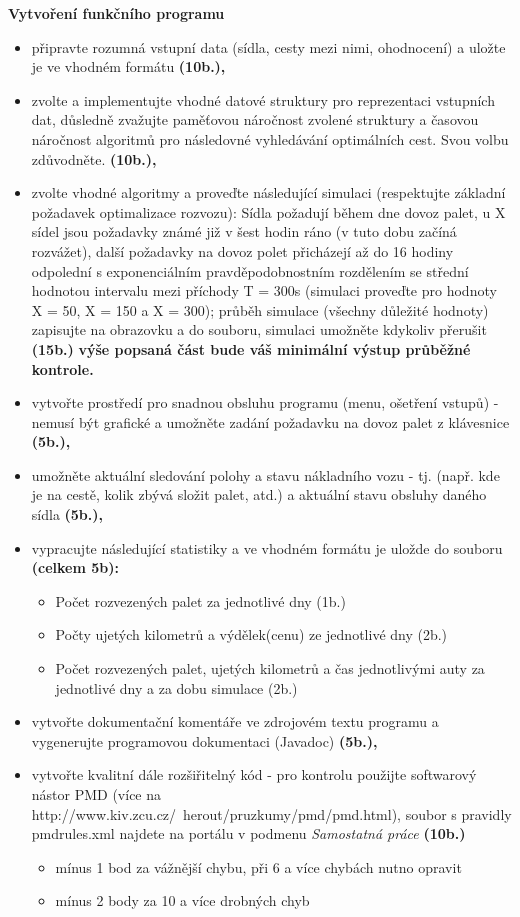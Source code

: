 \documentclass[ 12pt, a4paper]{article}
\begin{document}
\textbf{Vytvoření funkčního programu}\newline
\begin{itemize}
  \item připravte rozumná vstupní data (sídla, cesty mezi nimi, ohodnocení) a uložte je ve vhodném formátu \textbf{(10b.),}
  \item zvolte a implementujte vhodné datové struktury pro reprezentaci vstupních dat, důsledně zvažujte paměťovou náročnost zvolené struktury a časovou náročnost algoritmů pro následovné vyhledávání optimálních cest. Svou volbu zdůvodněte. \textbf{(10b.),}
  \item zvolte vhodné algoritmy a proveďte následující simulaci (respektujte základní požadavek optimalizace rozvozu): Sídla požadují během dne dovoz palet, u X sídel jsou požadavky známé již v šest hodin ráno (v tuto dobu začíná rozvážet), další požadavky na dovoz polet přicházejí až do 16 hodiny odpolední s exponenciálním pravděpodobnostním rozdělením se střední hodnotou intervalu mezi příchody T = 300s (simulaci proveďte pro hodnoty X = 50, X = 150 a X = 300); průběh simulace (všechny důležité hodnoty) zapisujte na obrazovku a do souboru, simulaci umožněte kdykoliv přerušit \textbf{(15b.)}\newline
  \textbf{výše popsaná část bude váš minimální výstup průběžné kontrole.}
  \item vytvořte prostředí pro snadnou obsluhu programu (menu, ošetření vstupů) - nemusí být grafické a umožněte zadání požadavku na dovoz palet z klávesnice \textbf{(5b.),}
  \item umožněte aktuální sledování polohy a stavu nákladního vozu - tj. (např. kde je na cestě, kolik zbývá složit palet, atd.) a aktuální stavu obsluhy daného sídla \textbf{(5b.),}
  \item vypracujte následující statistiky a ve vhodném formátu je uložde do souboru \textbf{(celkem 5b):}
  \begin{itemize}
    \item Počet rozvezených palet za jednotlivé dny (1b.)
    \item Počty ujetých kilometrů a výdělek(cenu) ze jednotlivé dny (2b.)
    \item Počet rozvezených palet, ujetých kilometrů a čas jednotlivými auty za jednotlivé dny a za dobu simulace (2b.)
  \end{itemize}
  \item vytvořte dokumentační komentáře ve zdrojovém textu programu a vygenerujte programovou dokumentaci (Javadoc) \textbf{(5b.),}
  \item vytvořte kvalitní dále rozšiřitelný kód - pro kontrolu použijte softwarový nástor PMD (více na http://www.kiv.zcu.cz/~herout/pruzkumy/pmd/pmd.html), soubor s pravidly pmdrules.xml najdete na portálu v podmenu {\it Samostatná práce} \textbf{(10b.)}
  \begin{itemize}
    \item mínus 1 bod za vážnější chybu, při 6 a více chybách nutno opravit
    \item mínus 2 body za 10 a více drobných chyb
  \end{itemize}
\end{itemize}
\end{document}
